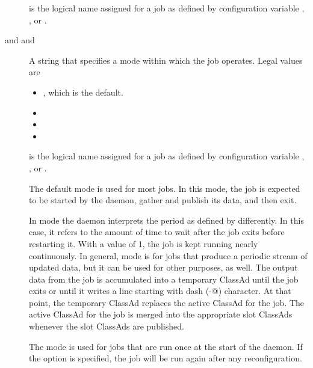 \begin{description}
   is the logical name assigned for a job as defined by
  configuration variable , 
  , or .

\label{param:StartdCronJobMode}
\label{param:ScheddCronJobMode}
\label{param:BenchmarksJobMode}
\item[\Macro{STARTD\_CRON\_<JobName>\_MODE} 
       and \Macro{SCHEDD\_CRON\_<JobName>\_MODE}
       and \Macro{BENCHMARKS\_<JobName>\_MODE}]
  A string that specifies a mode within which the job operates.
  Legal values are 
  \begin{itemize}
  \item {}, which is the default.  
  \item {}
  \item {}
  \item {}
  \end{itemize}

   is the logical name assigned for a job as defined by
  configuration variable , 
  , or .

  The default  mode is used for most jobs.
  In this mode, the job is expected to be started by the
   daemon, gather and publish its data, and then exit.

  In  mode
  the  daemon interprets the period as defined by 
   differently.
  In this case, it refers to the amount of time to wait after the job exits
  before restarting it.  With a value of 1, the job is kept
  running nearly continuously.
  In general,  mode is for jobs that produce
  a periodic stream of updated data, but it can be used for other
  purposes, as well.
  The output data from the job is accumulated into a temporary ClassAd 
  until the job exits or until it writes 
  a line starting with dash (\verb@-@) character.
  At that point,
  the temporary ClassAd replaces the active ClassAd for the  job.
  The active ClassAd for the job is  merged into the appropriate 
  slot ClassAds whenever the slot ClassAds are published.

  The  mode is used for jobs that are run once at the
  start of the daemon.  If the  option is
  specified, the job will be run again after any reconfiguration.


\end{description}
